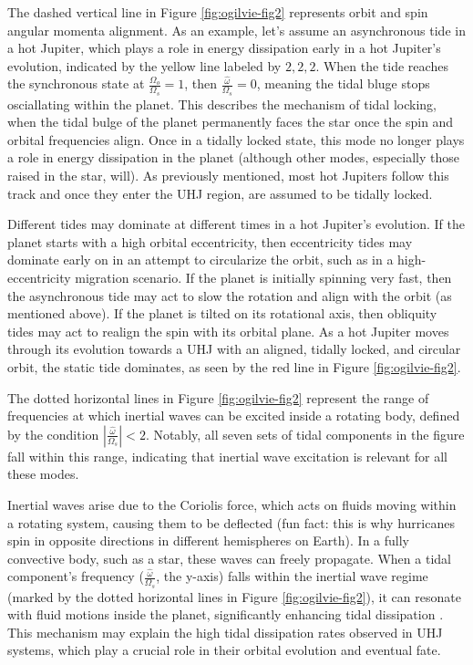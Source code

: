 \documentclass[oneside,12pt]{amsart}
\numberwithin{page}{section}
\begin{document}
The dashed vertical line in Figure \ref{fig:ogilvie-fig2} represents orbit and spin angular momenta alignment. As an example, let's assume an asynchronous tide in a hot Jupiter, which plays a role in energy dissipation early in a hot Jupiter's evolution, indicated by the yellow line labeled by $2, 2, 2$. When the tide reaches the synchronous state at $\frac{\Omega_o}{\Omega_s} = 1$, then $\frac{\hat{\omega}}{\Omega_s} = 0$, meaning the tidal bluge stops osciallating within the planet. This describes the mechanism of tidal locking, when the tidal bulge of the planet permanently faces the star once the spin and orbital frequencies align. Once in a tidally locked state, this mode no longer plays a role in energy dissipation in the planet (although other modes, especially those raised in the star, will). As previously mentioned, most hot Jupiters follow this track and once they enter the UHJ region, are assumed to be tidally locked.

Different tides may dominate at different times in a hot Jupiter's evolution. If the planet starts with a high orbital eccentricity, then eccentricity tides may dominate early on in an attempt to circularize the orbit, such as in a high-eccentricity migration scenario. If the planet is initially spinning very fast, then the asynchronous tide may act to slow the rotation and align with the orbit (as mentioned above). If the planet is tilted on its rotational axis, then obliquity tides may act to realign the spin with its orbital plane. As a hot Jupiter moves through its evolution towards a UHJ with an aligned, tidally locked, and circular orbit, the static tide dominates, as seen by the red line in Figure \ref{fig:ogilvie-fig2}.

The dotted horizontal lines in Figure \ref{fig:ogilvie-fig2} represent the range of frequencies at which inertial waves can be excited inside a rotating body, defined by the condition $|\frac{\hat{\omega}}{\Omega_s}| < 2$. Notably, all seven sets of tidal components in the figure fall within this range, indicating that inertial wave excitation is relevant for all these modes.

Inertial waves arise due to the Coriolis force, which acts on fluids moving within a rotating system, causing them to be deflected (fun fact: this is why hurricanes spin in opposite directions in different hemispheres on Earth). In a fully convective body, such as a star, these waves can freely propagate. When a tidal component’s frequency ($\frac{\hat{\omega}}{\Omega_s}$, the y-axis) falls within the inertial wave regime (marked by the dotted horizontal lines in Figure \ref{fig:ogilvie-fig2}), it can resonate with fluid motions inside the planet, significantly enhancing tidal dissipation \citep{ogilvie2014tidal}. This mechanism may explain the high tidal dissipation rates observed in UHJ systems, which play a crucial role in their orbital evolution and eventual fate.
\end{document}
